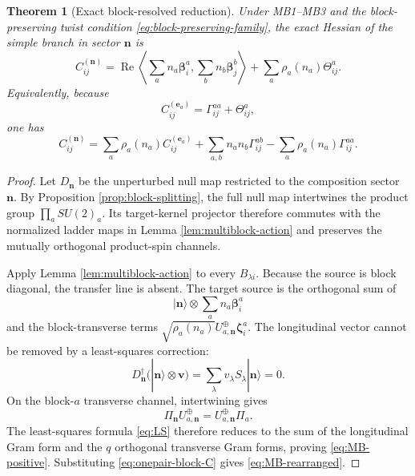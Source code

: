 \documentclass[11pt]{article}
\numberwithin{equation}{section}
\newtheorem{theorem}{Theorem}[section]
\newcommand{\bn}{\mathbf n}
\newcommand{\be}{\mathbf e}
\newcommand{\bbeta}{\boldsymbol\beta}
\newcommand{\bzeta}{\boldsymbol\zeta}
\newcommand{\Ree}{\operatorname{Re}}
\begin{document}
\begin{theorem}[Exact block-resolved reduction]
\label{thm:block-resolved}
Under MB1--MB3 and the block-preserving twist condition \eqref{eq:block-preserving-family}, the exact Hessian of the simple branch in sector $\bn$ is
\begin{equation}
 \boxed{
 C_{ij}^{(\bn)}
 =\Ree\left\langle
 \sum_an_a\bbeta_i^a,
 \sum_bn_b\bbeta_j^b
 \right\rangle
 +\sum_a\rho_a(n_a)\Theta_{ij}^a.}
 \label{eq:MB-positive}
\end{equation}
Equivalently, because
\begin{equation}
 C_{ij}^{(\be_a)}=\Gamma_{ij}^{aa}+\Theta_{ij}^a,
 \label{eq:onepair-block-C}
\end{equation}
one has
\begin{equation}
 \boxed{
 C_{ij}^{(\bn)}
 =\sum_a\rho_a(n_a)C_{ij}^{(\be_a)}
 +\sum_{a,b}n_an_b\Gamma_{ij}^{ab}
 -\sum_a\rho_a(n_a)\Gamma_{ij}^{aa}.}
 \label{eq:MB-rearranged}
\end{equation}
\end{theorem}

\begin{proof}
Let $D_{\bn}$ be the unperturbed null map restricted to the composition sector $\bn$.  By Proposition \ref{prop:block-splitting}, the full null map intertwines the product group $\prod_aSU(2)_a$.  Its target-kernel projector therefore commutes with the normalized ladder maps in Lemma \ref{lem:multiblock-action} and preserves the mutually orthogonal product-spin channels.

Apply Lemma \ref{lem:multiblock-action} to every $B_{\lambda i}$.  Because the source is block diagonal, the transfer line is absent.  The target source is the orthogonal sum of
\begin{equation}
 |\bn\rangle\otimes\sum_an_a\bbeta_i^a
 \label{eq:longitudinal-target}
\end{equation}
and the block-transverse terms $\sqrt{\rho_a(n_a)}U_{a,\bn}^{\oplus}\bzeta_i^a$.  The longitudinal vector cannot be removed by a least-squares correction:
\begin{equation}
 D_{\bn}^\dagger\bigl(|\bn\rangle\otimes\mathbf v\bigr)
 =\sum_\lambda v_\lambda S_\lambda|\bn\rangle=0.
 \label{eq:longitudinal-kernel}
\end{equation}
On the block-$a$ transverse channel, intertwining gives
\begin{equation}
 \Pi_{\bn}U_{a,\bn}^{\oplus}
 =U_{a,\bn}^{\oplus}\Pi_a.
 \label{eq:block-intertwine-Pi}
\end{equation}
The least-squares formula \eqref{eq:LS} therefore reduces to the sum of the longitudinal Gram form and the $q$ orthogonal transverse Gram forms, proving \eqref{eq:MB-positive}.  Substituting \eqref{eq:onepair-block-C} gives \eqref{eq:MB-rearranged}.
\end{proof}
\end{document}
